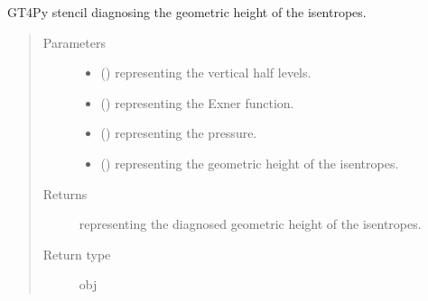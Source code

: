 \documentclass[letterpaper,10pt,english]{sphinxmanual}
\begin{document}
\begin{fulllineitems}
\begin{fulllineitems}
\begin{quote}
\begin{description}
\end{description}\end{quote}

\end{fulllineitems}


\begin{fulllineitems}
\label{\detokenize{api:tasmania.dycore.diagnostic_isentropic.DiagnosticIsentropic._stencil_diagnosing_height_defs}}
GT4Py stencil diagnosing the geometric height of the isentropes.
\begin{quote}\begin{description}
\item[{Parameters}] \leavevmode\begin{itemize}
\item {} 
 () \textendash{}  representing the vertical half levels.

\item {} 
 () \textendash{}  representing the Exner function.

\item {} 
 () \textendash{}  representing the pressure.

\item {} 
 () \textendash{}  representing the geometric height of the isentropes.

\end{itemize}

\item[{Returns}] \leavevmode
{} representing the diagnosed geometric height of the isentropes.

\item[{Return type}] \leavevmode
obj

\end{description}\end{quote}

\end{fulllineitems}


\end{fulllineitems}
\end{document}
